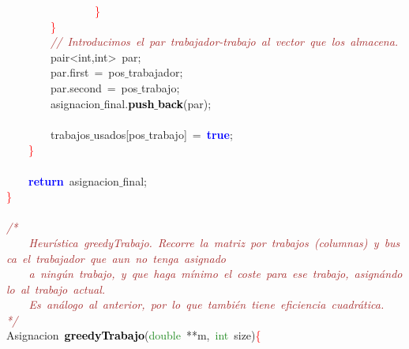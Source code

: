 \mbox{}\ \ \ \ \ \ \ \ \ \ \ \ \ \ \ \ \textcolor{Red}{\}}\ \ \ \  \\
\mbox{}\ \ \ \ \ \ \ \ \textcolor{Red}{\}} \\
\mbox{}\ \ \ \ \ \ \ \ \textit{\textcolor{Brown}{//\ Introducimos\ el\ par\ trabajador-trabajo\ al\ vector\ que\ los\ almacena.\ }} \\
\mbox{}\ \ \ \ \ \ \ \ \textcolor{TealBlue}{pair\textless{}int,int\textgreater{}}\ par\textcolor{BrickRed}{;}\  \\
\mbox{}\ \ \ \ \ \ \ \ par\textcolor{BrickRed}{.}first\ \textcolor{BrickRed}{=}\ pos$\_$trabajador\textcolor{BrickRed}{;}\ \  \\
\mbox{}\ \ \ \ \ \ \ \ par\textcolor{BrickRed}{.}second\ \textcolor{BrickRed}{=}\ pos$\_$trabajo\textcolor{BrickRed}{;}\  \\
\mbox{}\ \ \ \ \ \ \ \ asignacion$\_$final\textcolor{BrickRed}{.}\textbf{\textcolor{Black}{push$\_$back}}\textcolor{BrickRed}{(}par\textcolor{BrickRed}{);}\  \\
\mbox{} \\
\mbox{}\ \ \ \ \ \ \ \ trabajos$\_$usados\textcolor{BrickRed}{[}pos$\_$trabajo\textcolor{BrickRed}{]}\ \textcolor{BrickRed}{=}\ \textbf{\textcolor{Blue}{true}}\textcolor{BrickRed}{;}\  \\
\mbox{}\ \ \ \ \textcolor{Red}{\}} \\
\mbox{} \\
\mbox{}\ \ \ \ \textbf{\textcolor{Blue}{return}}\ asignacion$\_$final\textcolor{BrickRed}{;}\  \\
\mbox{}\textcolor{Red}{\}} \\
\mbox{} \\
\mbox{}\textit{\textcolor{Brown}{/*\ }} \\
\mbox{}\textit{\textcolor{Brown}{\ \ \ \ Heurística\ greedyTrabajo.\ Recorre\ la\ matriz\ por\ trabajos\ (columnas)\ y\ busca\ el\ trabajador\ que\ aun\ no\ tenga\ asignado}} \\
\mbox{}\textit{\textcolor{Brown}{\ \ \ \ a\ ningún\ trabajo,\ y\ que\ haga\ mínimo\ el\ coste\ para\ ese\ trabajo,\ asignándolo\ al\ trabajo\ actual.\ }} \\
\mbox{}\textit{\textcolor{Brown}{\ \ \ \ Es\ análogo\ al\ anterior,\ por\ lo\ que\ también\ tiene\ eficiencia\ cuadrática.\ \ }} \\
\mbox{}\textit{\textcolor{Brown}{*/}} \\
\mbox{}\textcolor{TealBlue}{Asignacion}\ \textbf{\textcolor{Black}{greedyTrabajo}}\textcolor{BrickRed}{(}\textcolor{ForestGreen}{double}\ \textcolor{BrickRed}{**}m\textcolor{BrickRed}{,}\ \textcolor{ForestGreen}{int}\ size\textcolor{BrickRed}{)}\textcolor{Red}{\{} \\

